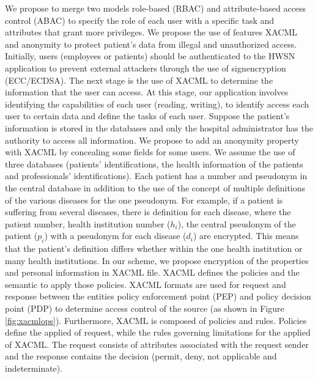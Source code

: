 \documentclass[a4paper,11pt]{article}
\begin{document}
\begin{enumerate}
We propose to merge two models role-based (RBAC) and attribute-based access control (ABAC) to specify the role of each user with a specific task and attributes that grant more privileges. We propose the use of features XACML and anonymity to protect patient's data from illegal and unauthorized access. Initially, users (employees or patients) should be authenticated to the HWSN application to prevent external attackers through the use of signencryption (ECC/ECDSA). The next stage is the use of XACML to determine the information that the user can access. At this stage, our application involves identifying the capabilities of each user (reading, writing), to identify access each user to certain data and define the tasks of each user. Suppose the patient's information is stored in the databases and only the hospital administrator has the authority to access all information. We propose to add an anonymity property with XACML by concealing some fields for some users. We assume the use of three databases (patients' identifications, the health information of the patients and professionals' identifications). Each patient has a number and pseudonym in the central database in addition to the use of the concept of multiple definitions of the various diseases for the one pseudonym. For example, if a patient is suffering from several diseases, there is definition for each disease, where the patient number, health institution number ($h_i$), the central pseudonym of the patient ($p_i$) with a pseudonym for each disease ($d_i$) are encrypted. This means that the patient's definition differs whether within the one health institution or many health institutions. In our scheme, we propose encryption of the properties and personal information in XACML file. XACML defines the policies and the semantic to apply those policies. XACML formats are used for request and response between the entities policy enforcement point (PEP) and policy decision point (PDP) to determine access control of the source \cite{pr42} (as shown in Figure \ref{fig:xacmlops}). Furthermore, XACML is composed of policies and rules. Policies define the applied of request, while the rules governing limitations for the applied of XACML. The request consists of attributes associated with the request sender and the response contains the decision (permit, deny, not applicable and indeterminate).


\end{enumerate}
\end{document}
